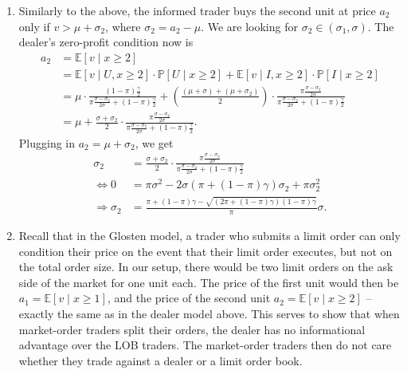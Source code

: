 \documentclass[a4paper]{article}
\begin{document}
\begin{enumerate}
	\item Similarly to the above, the informed trader buys the second unit at price $a_2$ only if $v > \mu + \sigma_2$, where $\sigma_2 = a_2 - \mu$. We are looking for $\sigma_2 \in (\sigma_1, \sigma)$. The dealer's zero-profit condition now is
	\begin{align*}
		a_2 &= \mathbb{E} [ v \mid x \geq 2]
		\\
		&= \mathbb{E} [ v \mid U, x \geq 2] \cdot \mathbb{P} [ U \mid x \geq 2 ] + \mathbb{E} [ v \mid I, x \geq 2] \cdot \mathbb{P} [ I \mid x \geq 2 ]
		\\
		&= \mu \cdot \frac{(1-\pi) \frac{\gamma}{2}}{\pi \frac{\sigma - \sigma_2}{2 \sigma} + (1-\pi) \frac{\gamma}{2}} + \left( \frac{(\mu + \sigma) + (\mu + \sigma_2)}{2} \right) \cdot \frac{\pi \frac{\sigma - \sigma_2}{2 \sigma}}{\pi \frac{\sigma - \sigma_2}{2 \sigma} + (1-\pi) \frac{\gamma}{2}}
		\\
		&= \mu + \frac{\sigma + \sigma_2}{2} \cdot \frac{\pi \frac{\sigma - \sigma_2}{2 \sigma}}{\pi \frac{\sigma - \sigma_2}{2 \sigma} + (1-\pi) \frac{\gamma}{2}}.
	\end{align*}
	Plugging in $a_2 = \mu + \sigma_2$, we get
	\begin{align*}
		\sigma_2 &= \frac{\sigma + \sigma_2}{2} \cdot \frac{\pi \frac{\sigma - \sigma_2}{2 \sigma}}{\pi \frac{\sigma - \sigma_2}{2 \sigma} + (1-\pi) \frac{\gamma}{2}}
		\\
		\Leftrightarrow
		0 &= \pi \sigma^2 - 2 \sigma \left( \pi + (1-\pi)\gamma \right) \sigma_2 + \pi \sigma_2^2
		\\
		\Rightarrow
		\sigma_2 &= \frac{ \pi + (1-\pi) \gamma - \sqrt{ (2\pi + (1-\pi)\gamma) (1-\pi) \gamma } }{\pi} \sigma.
	\end{align*}
	
	\item Recall that in the Glosten model, a trader who submits a limit order can only condition their price on the event that their limit order executes, but not on the total order size. In our setup, there would be two limit orders on the ask side of the market for one unit each. The price of the first unit would then be $a_1 = \mathbb{E} [ v \mid x \geq 1]$, and the price of the second unit $a_2 = \mathbb{E} [ v \mid x \geq 2]$ -- exactly the same as in the dealer model above. This serves to show that when market-order traders split their orders, the dealer has no informational advantage over the LOB traders. The market-order traders then do not care whether they trade against a dealer or a limit order book.
	

\end{enumerate}
\end{document}
